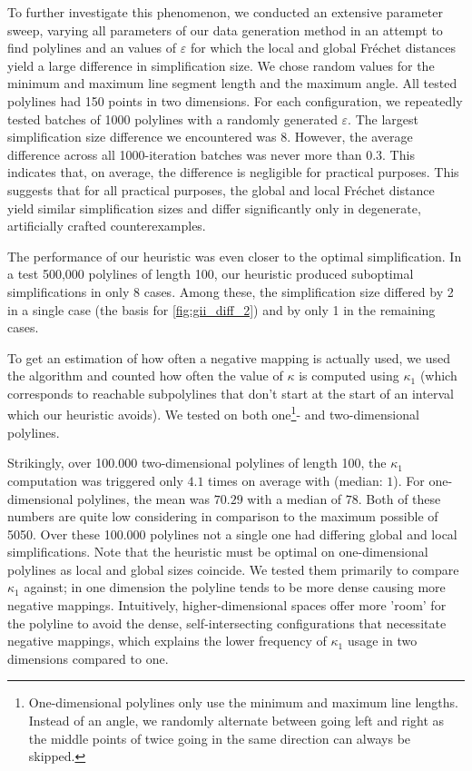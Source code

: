 To further investigate this phenomenon, we conducted an extensive parameter sweep, varying all parameters of our data generation method in an attempt to find polylines and an values of \(\varepsilon\) for which the local and global Fréchet distances yield a large difference in simplification size. We chose random values for the minimum and maximum line segment length and the maximum angle. All tested polylines had 150 points in two dimensions. For each configuration, we repeatedly tested batches of 1000 polylines with a randomly generated \(\varepsilon\). The largest simplification size difference we encountered was 8. However, the average difference across all 1000-iteration batches was never more than 0.3. This indicates that, on average, the difference is negligible for practical purposes. This suggests that for all practical purposes, the global and local Fréchet distance yield similar simplification sizes and differ significantly only in degenerate, artificially crafted counterexamples.

The performance of our heuristic was even closer to the optimal simplification. In a test 500,000 polylines of length 100, our heuristic produced suboptimal simplifications in only 8 cases. Among these, the simplification size differed by 2 in a single case (the basis for \cref{fig:gii_diff_2}) and by only 1 in the remaining cases. 

To get an estimation of how often a negative mapping is actually used, we used the \citeauthor{polyline_simplification_has_cubic_complexity_bringmannetal} algorithm and counted how often the value of \(\kappa\) is computed using \(\kappa_1\) (which corresponds to reachable subpolylines that don't start at the start of an interval which our heuristic avoids). We tested on both one\footnote{One-dimensional polylines only use the minimum and maximum line lengths. Instead of an angle, we randomly alternate between going left and right as the middle points of twice going in the same direction can always be skipped.}- and two-dimensional polylines. 

Strikingly, over 100.000 two-dimensional polylines of length 100, the \(\kappa_1\) computation was triggered only \(4.1\) times on average with (median: \(1\)). For one-dimensional polylines, the mean was \(70.29\) with a median of \(78\). Both of these numbers are quite low considering in comparison to the maximum possible of 5050. Over these 100.000 polylines not a single one had differing global and local simplifications. Note that the heuristic must be optimal on one-dimensional polylines as local and global sizes coincide. We tested them primarily to compare \(\kappa_1\) against; in one dimension the polyline tends to be more dense causing more negative mappings. Intuitively, higher-dimensional spaces offer more 'room' for the polyline to avoid the dense, self-intersecting configurations that necessitate negative mappings, which explains the lower frequency of \(\kappa_1\) usage in two dimensions compared to one.
